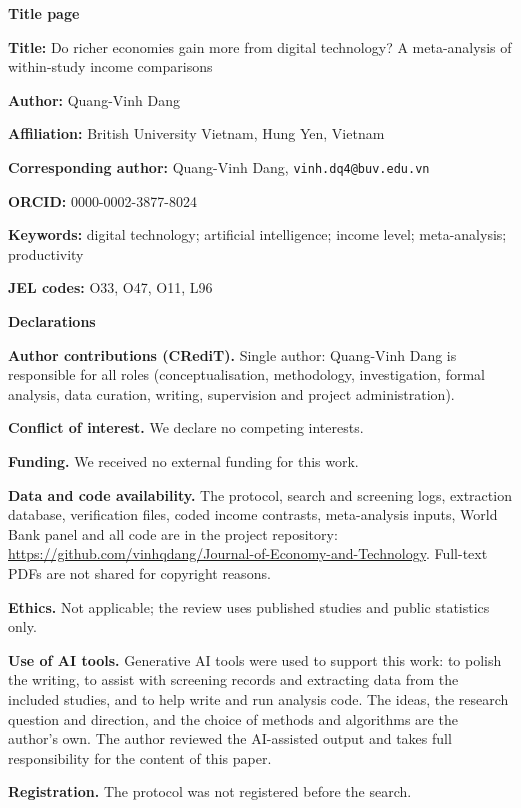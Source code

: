 \documentclass[11pt,a4paper]{article}
\begin{document}
\thispagestyle{empty}
{\large\textbf{Title page}}

\textbf{Title:} Do richer economies gain more from digital technology? A meta-analysis of within-study income comparisons

\textbf{Author:} Quang-Vinh Dang

\textbf{Affiliation:} British University Vietnam, Hung Yen, Vietnam

\textbf{Corresponding author:} Quang-Vinh Dang, \texttt{vinh.dq4@buv.edu.vn}

\textbf{ORCID:} 0000-0002-3877-8024

\textbf{Keywords:} digital technology; artificial intelligence; income level; meta-analysis; productivity

\textbf{JEL codes:} O33, O47, O11, L96

\textbf{Declarations}

\textbf{Author contributions (CRediT).} Single author: Quang-Vinh Dang is responsible for all roles (conceptualisation, methodology, investigation, formal analysis, data curation, writing, supervision and project administration).

\textbf{Conflict of interest.} We declare no competing interests.

\textbf{Funding.} We received no external funding for this work.

\textbf{Data and code availability.} The protocol, search and screening logs, extraction database, verification files, coded income contrasts, meta-analysis inputs, World Bank panel and all code are in the project repository: \url{https://github.com/vinhqdang/Journal-of-Economy-and-Technology}. Full-text PDFs are not shared for copyright reasons.

\textbf{Ethics.} Not applicable; the review uses published studies and public statistics only.

\textbf{Use of AI tools.} Generative AI tools were used to support this work: to polish the writing, to assist with screening records and extracting data from the included studies, and to help write and run analysis code. The ideas, the research question and direction, and the choice of methods and algorithms are the author's own. The author reviewed the AI-assisted output and takes full responsibility for the content of this paper.

\textbf{Registration.} The protocol was not registered before the search.
\end{document}
